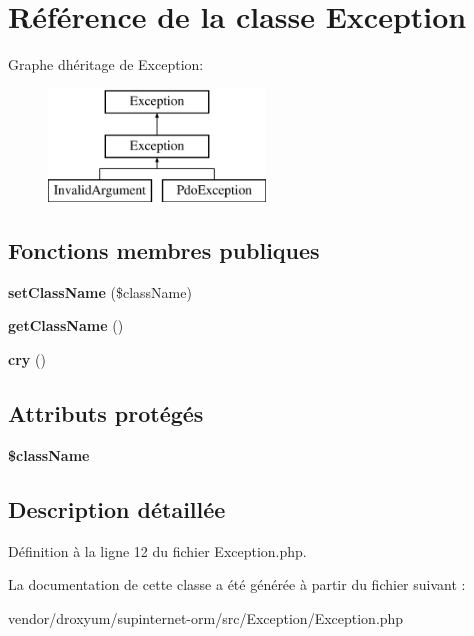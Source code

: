\hypertarget{class_o_r_m_1_1_exception_1_1_exception}{}\section{Référence de la classe Exception}
\label{class_o_r_m_1_1_exception_1_1_exception}
Graphe d\textquotesingle{}héritage de Exception\+:\begin{figure}[H]
\begin{center}
\leavevmode
\includegraphics[height=3.000000cm]{class_o_r_m_1_1_exception_1_1_exception}
\end{center}
\end{figure}
\subsection*{Fonctions membres publiques}
\begin{DoxyCompactItemize}
\item 
{\bfseries set\+Class\+Name} (\$class\+Name)\hypertarget{class_o_r_m_1_1_exception_1_1_exception_aaf49e68e9856c8fc687f4a70febdbcb2}{}\label{class_o_r_m_1_1_exception_1_1_exception_aaf49e68e9856c8fc687f4a70febdbcb2}

\item 
{\bfseries get\+Class\+Name} ()\hypertarget{class_o_r_m_1_1_exception_1_1_exception_ab8f8ee56588ebf5091c288e44ebdfaf4}{}\label{class_o_r_m_1_1_exception_1_1_exception_ab8f8ee56588ebf5091c288e44ebdfaf4}

\item 
{\bfseries cry} ()\hypertarget{class_o_r_m_1_1_exception_1_1_exception_af0609156a2ffd2ad4668c72e4cb28988}{}\label{class_o_r_m_1_1_exception_1_1_exception_af0609156a2ffd2ad4668c72e4cb28988}

\end{DoxyCompactItemize}
\subsection*{Attributs protégés}
\begin{DoxyCompactItemize}
\item 
{\bfseries \$class\+Name}\hypertarget{class_o_r_m_1_1_exception_1_1_exception_acd6a475a6eeb092f4eea3e19e502d67d}{}\label{class_o_r_m_1_1_exception_1_1_exception_acd6a475a6eeb092f4eea3e19e502d67d}

\end{DoxyCompactItemize}


\subsection{Description détaillée}


Définition à la ligne 12 du fichier Exception.\+php.



La documentation de cette classe a été générée à partir du fichier suivant \+:\begin{DoxyCompactItemize}
\item 
vendor/droxyum/supinternet-\/orm/src/\+Exception/Exception.\+php\end{DoxyCompactItemize}
